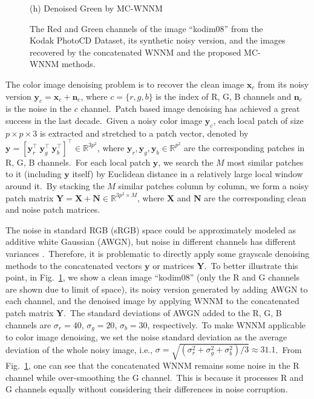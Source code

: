 \documentclass[10pt,twocolumn,letterpaper]{article}
\begin{document}
\begin{figure}
{\begin{minipage}[t]{0.25\textwidth}
{\footnotesize (h) Denoised Green by MC-WNNM }
\end{minipage}
}\vspace{-1mm}
\caption{The Red and Green channels of the image ``kodim08'' from the Kodak PhotoCD Dataset, its synthetic noisy version, and the images recovered by the concatenated WNNM and the proposed MC-WNNM methods.}
\label{f1}
\vspace{-3mm}
\end{figure}

The color image denoising problem is to recover the clean image $\mathbf{x}_{c}$ from its noisy version $\mathbf{y}_{c}=\mathbf{x}_{c}+\mathbf{n}_{c}$, where $c=\{r, g, b\}$ is the index of R, G, B channels and $\mathbf{n}_{c}$ is the noise in the $c$ channel.\ Patch based image denoising \cite{foe,ksvd,bm3d,lssc,epll,ncsr,mlp,csf,wnnm,pgpd,chen2015learning,dncnn} has achieved a great success in the last decade.\ Given a noisy color image $\mathbf{y}_{c}$, each local patch of size $p\times p \times 3$ is extracted and stretched to a patch vector, denoted by $\mathbf{y}=[\mathbf{y}_{r}^{\top}\ \mathbf{y}_{g}^{\top}\ \mathbf{y}_{b}^{\top}]^{\top}\in\mathbb{R}^{3p^{2}}$, where $\mathbf{y}_{r}, \mathbf{y}_{g}, \mathbf{y}_{b}\in\mathbb{R}^{p^{2}}$ are the corresponding patches in R, G, B channels.\ For each local patch $\mathbf{y}$, we search the $M$ most similar patches to it (including $\mathbf{y}$ itself) by Euclidean distance in a relatively large local window around it.\ By stacking the $M$ similar patches column by column, we form a noisy patch matrix $\mathbf{Y}=\mathbf{X}+\mathbf{N}\in\mathbb{R}^{3p^{2}\times M}$, where $\mathbf{X}$ and $\mathbf{N}$ are the corresponding clean and noise patch matrices.

The noise in standard RGB (sRGB) space could be approximately modeled as additive white Gaussian (AWGN), but noise in different channels has different variances \cite{Liu2008,Leungtip,crosschannel2016}.\ Therefore, it is problematic to directly apply some grayscale denoising methods to the concatenated vectors $\mathbf{y}$ or matrices $\mathbf{Y}$.\ To better illustrate this point, in Fig.\ \ref{f1}, we show a clean image ``kodim08'' (only the R and G channels are shown due to limit of space), its noisy version generated by adding AWGN to each channel, and the denoised image by applying WNNM \cite{wnnmijcv} to the concatenated  patch matrix $\mathbf{Y}$.\ The standard deviations of AWGN added to the R, G, B channels are $\sigma_{r}=40$, $\sigma_{g}=20$, $\sigma_{b}=30$, respectively.\ To make WNNM applicable to color image denoising, we set the noise standard deviation as the average deviation of the whole noisy image, i.e., $\sigma=\sqrt{(\sigma_{r}^{2}+\sigma_{g}^{2}+\sigma_{b}^{2})/3}\approx31.1$.\ From Fig.\ \ref{f1}, one can see that the concatenated WNNM remains some noise in the R channel while over-smoothing the G channel.\ This is because it processes R and G channels equally without considering their differences in noise corruption.
\end{document}
